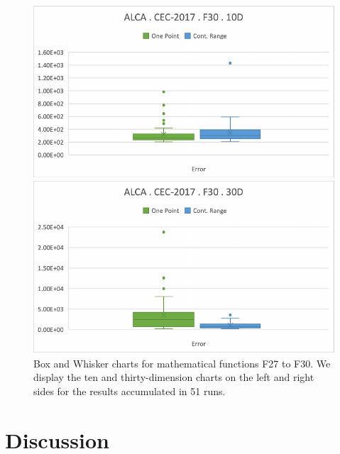 \documentclass[graybox]{svmult}
\begin{document}
\begin{figure}[!ht]
\begin{minipage}[h]{0.49\linewidth}
        \end{minipage}
        \vfill
        \vspace{0.05 cm}
        \begin{minipage}[h]{0.49\linewidth}
            \includegraphics[width=1\linewidth]{img/fig_experiment_F30x10D.pdf} 
        \end{minipage}
        \hfill
        \begin{minipage}[h]{0.49\linewidth}
            \includegraphics[width=1\linewidth]{img/fig_experiment_F30x30D.pdf} 
        \end{minipage}

        \caption{Box and Whisker charts for mathematical functions F27 to F30. We display the ten and thirty-dimension charts on the left and right sides for the results accumulated in 51 runs.} \label{fig.experiment_F27-F30}
    \end{figure}

    \FloatBarrier


\section{Discussion}
    \label{section.discussion}
\end{document}
